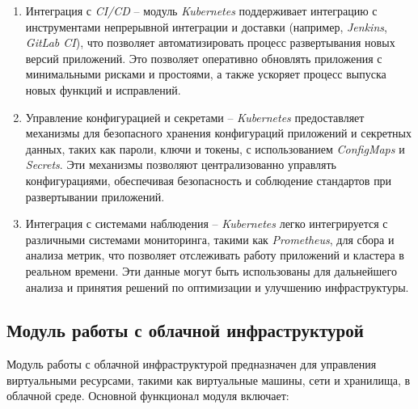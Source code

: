 \begin{enumerate}
    \item Интеграция с \textit{CI/CD} -- модуль \textit{Kubernetes} поддерживает интеграцию с инструментами непрерывной интеграции и доставки (например, \textit{Jenkins}, \textit{GitLab CI}), что позволяет автоматизировать процесс развертывания новых версий приложений. Это позволяет оперативно обновлять приложения с минимальными рисками и простоями, а также ускоряет процесс выпуска новых функций и исправлений.
    \item Управление конфигурацией и секретами -- \textit{Kubernetes} предоставляет механизмы для безопасного хранения конфигураций приложений и секретных данных, таких как пароли, ключи и токены, с использованием \textit{ConfigMaps} и \textit{Secrets}. Эти механизмы позволяют централизованно управлять конфигурациями, обеспечивая безопасность и соблюдение стандартов при развертывании приложений.
    \item Интеграция с системами наблюдения -- \textit{Kubernetes} легко интегрируется с различными системами мониторинга, такими как \textit{Prometheus}, для сбора и анализа метрик, что позволяет отслеживать работу приложений и кластера в реальном времени. Эти данные могут быть использованы для дальнейшего анализа и принятия решений по оптимизации и улучшению инфраструктуры.
\end{enumerate}

\subsection{Модуль работы с облачной инфраструктурой}
\label{sec:cloud_infrastructure_functionality}

Модуль работы с облачной инфраструктурой предназначен для управления виртуальными ресурсами, такими как виртуальные машины, сети и хранилища, в облачной среде. Основной функционал модуля включает:


